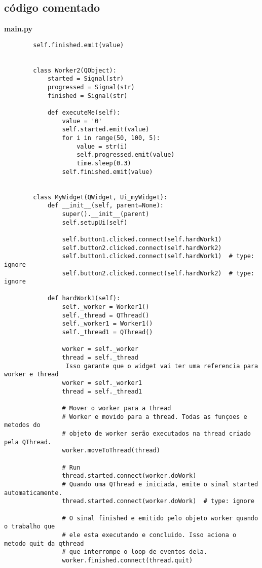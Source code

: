 \documentclass[12pt,a4paper]{article}
\begin{document}
    \subsection{ código comentado}
    \textbf{main.py}
    \begin{lstlisting}
        self.finished.emit(value)


        class Worker2(QObject):
            started = Signal(str)
            progressed = Signal(str)
            finished = Signal(str)
        
            def executeMe(self):
                value = '0'
                self.started.emit(value)
                for i in range(50, 100, 5):
                    value = str(i)
                    self.progressed.emit(value)
                    time.sleep(0.3)
                self.finished.emit(value)
        
        
        class MyWidget(QWidget, Ui_myWidget):
            def __init__(self, parent=None):
                super().__init__(parent)
                self.setupUi(self)
        
                self.button1.clicked.connect(self.hardWork1)
                self.button2.clicked.connect(self.hardWork2)
                self.button1.clicked.connect(self.hardWork1)  # type: ignore
                self.button2.clicked.connect(self.hardWork2)  # type: ignore
        
            def hardWork1(self):
                self._worker = Worker1()
                self._thread = QThread()
                self._worker1 = Worker1()
                self._thread1 = QThread()
        
                worker = self._worker
                thread = self._thread
                 Isso garante que o widget vai ter uma referencia para worker e thread
                worker = self._worker1
                thread = self._thread1
        
                # Mover o worker para a thread
                # Worker e movido para a thread. Todas as funçoes e metodos do
                # objeto de worker serão executados na thread criado pela QThread.
                worker.moveToThread(thread)
        
                # Run
                thread.started.connect(worker.doWork)
                # Quando uma QThread e iniciada, emite o sinal started automaticamente.
                thread.started.connect(worker.doWork)  # type: ignore
        
                # O sinal finished e emitido pelo objeto worker quando o trabalho que
                # ele esta executando e concluido. Isso aciona o metodo quit da qthread
                # que interrompe o loop de eventos dela.
                worker.finished.connect(thread.quit)
        

\end{lstlisting}
\end{document}
